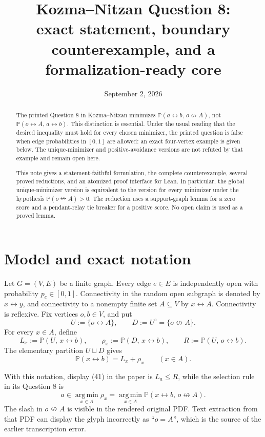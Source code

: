 \documentclass[11pt]{article}
\title{Kozma--Nitzan Question 8:\\
exact statement, boundary counterexample, and a formalization-ready core}
\author{}
\date{September 2, 2026}
\theoremstyle{definition}
\newcommand{\PP}{\mathbb P}
\newcommand{\con}{\leftrightarrow}
\newcommand{\ncon}{\nleftrightarrow}
\newcommand{\1}{\mathbf 1}
\newcommand{\argmin}{\operatorname*{arg\,min}}
\begin{document}
\maketitle

\begin{abstract}
The printed Question 8 in Kozma--Nitzan minimizes
\(\PP(a\con b,\,o\ncon A)\), not
\(\PP(o\con A,\,a\con b)\).  This distinction is essential.  Under the
usual reading that the desired inequality must hold for every chosen
minimizer, the printed question is false when edge probabilities in
\([0,1]\) are allowed: an exact four-vertex example is given below.  The
unique-minimizer and positive-avoidance versions are not refuted by that
example and remain open here.

This note gives a statement-faithful formulation, the complete
counterexample, several proved reductions, and an atomized proof interface
for Lean.  In particular, the global unique-minimizer version is equivalent
to the version for every minimizer under the hypothesis
\(\PP(o\ncon A)>0\).  The reduction uses a support-graph lemma for a
zero score and a pendant-relay tie breaker for a positive score.  No open
claim is used as a proved lemma.
\end{abstract}

\section{Model and exact notation}

Let \(G=(V,E)\) be a finite graph.  Every edge \(e\in E\) is independently
open with probability \(p_e\in[0,1]\).  Connectivity in the random open
subgraph is denoted by \(x\con y\), and connectivity to a nonempty finite
set \(A\subseteq V\) by \(x\con A\).  Connectivity is reflexive.  Fix
vertices \(o,b\in V\), and put
\begin{equation}\label{eq:U}
 U:=\{o\con A\},\qquad D:=U^{\mathrm c}=\{o\ncon A\}.
\end{equation}
For every \(x\in A\), define
\begin{equation}\label{eq:three-quantities}
 L_x:=\PP(U,\,x\con b),\qquad
 \rho_x:=\PP(D,\,x\con b),\qquad
 R:=\PP(U,\,o\con b).
\end{equation}
The elementary partition \(U\sqcup D\) gives
\begin{equation}\label{eq:total-split}
 \PP(x\con b)=L_x+\rho_x\qquad(x\in A).
\end{equation}

With this notation, display (41) in the paper is \(L_a\le R\), while the
selection rule in its Question 8 is
\begin{equation}\label{eq:q8-selection}
 a\in\argmin_{x\in A}\rho_x
 =\argmin_{x\in A}\PP(x\con b,\,o\ncon A).
\end{equation}
The slash in \(o\ncon A\) is visible in the rendered original PDF.  Text
extraction from that PDF can display the glyph incorrectly as ``\(o=A\)'',
which is the source of the earlier transcription error.
\end{document}
